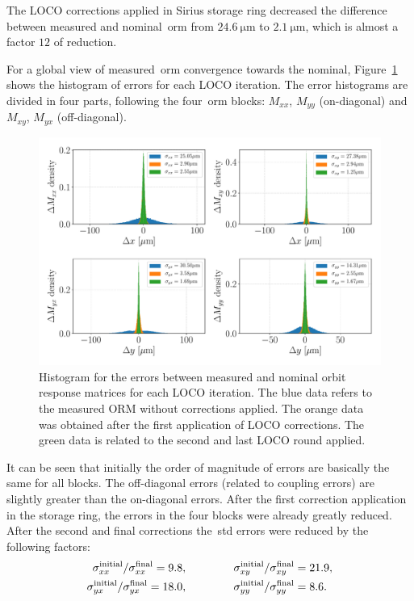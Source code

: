 The LOCO corrections applied in Sirius storage ring decreased the difference between measured and nominal~\gls{orm} from $\SI{24.6}{\micro\meter}$ to $\SI{2.1}{\micro\meter}$, which is almost a factor $12$ of reduction.

For a global view of measured~\gls{orm} convergence towards the nominal, Figure~\ref{fig:histogram} shows the histogram of errors for each LOCO iteration. The error histograms are divided in four parts, following the four~\gls{orm} blocks: $M_{xx}$, $M_{yy}$ (on-diagonal) and $M_{xy}$, $M_{yx}$ (off-diagonal). 
\begin{figure}
\centering
\includegraphics[width=1.0\textwidth]{figures/histogram_loco_iterations3_density.pdf}
\caption{Histogram for the errors between measured and nominal orbit response matrices for each LOCO iteration. The blue data refers to the measured ORM without corrections applied. The orange data was obtained after the first application of LOCO corrections. The green data is related to the second and last LOCO round applied.}
\label{fig:histogram}
\end{figure}

It can be seen that initially the order of magnitude of errors are basically the same for all blocks. The off-diagonal errors (related to coupling errors) are slightly greater than the on-diagonal errors. After the first correction application in the storage ring, the errors in the four blocks were already greatly reduced. After the second and final corrections the~\gls{std} errors were reduced by the following factors: 
\begin{align*}
    \sigma_{xx}^{\mathrm{initial}}/\sigma_{xx}^{\mathrm{final}} = 9.8, & \hspace{1.5cm} \sigma_{xy}^{\mathrm{initial}}/\sigma_{xy}^{\mathrm{final}} = 21.9, \\
    \sigma_{yx}^{\mathrm{initial}}/\sigma_{yx}^{\mathrm{final}} = 18.0, & \hspace{1.5cm}
    \sigma_{yy}^{\mathrm{initial}}/\sigma_{yy}^{\mathrm{final}} = 8.6. 
\end{align*}

